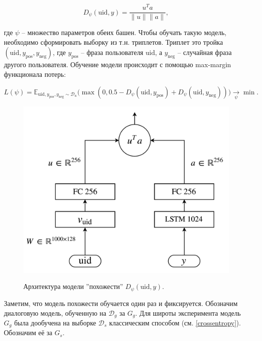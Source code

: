 \documentclass[12pt,a4paper]{amsart}
\begin{document}
\begin{itemize}
	\begin{equation} \label{eq:dssm-scoring-function}
	D_\psi (\text{uid}, y) = \frac{u^T a}{\lVert u \rVert \lVert a \rVert},
	\end{equation}
	
	где $\psi$ -- множество параметров обеих башен. Чтобы обучать такую модель, необходимо сформировать выборку из т.н. триплетов. Триплет это тройка $(\text{uid}, y_{\text{pos}}, y_{\text{neg}})$, где $y_{\text{pos}}$ -- фраза пользователя $\text{uid}$, а $y_{\text{neg}}$ -- случайная фраза другого пользователя. Обучение модели происходит с помощью max-margin функционала потерь:
	
	\begin{equation} \label{eq:dssm-loss}
	L(\psi) = \mathbb{E}_{\text{uid}, y_{\text{pos}}, y_{\text{neg}} \sim \mathcal{D}_u} \big(\max(0, 0.5 - D_\psi (\text{uid}, y_{\text{pos}}) +  D_\psi (\text{uid}, y_{\text{neg}}) )\big) \xrightarrow[\psi]{} \min.
	\end{equation}
\end{itemize}

\begin{figure}[htbp!]
	\caption{Архитектура модели ''похожести'' $D_\psi(\text{uid}, y)$.}
	\includegraphics[scale=0.4]{imgs/dssm-belikex.png}
	\label{fig:belikex-dssm}
	\centering
\end{figure}

Заметим, что модель похожести обучается один раз и фиксируется. Обозначим диалоговую модель, обученную на $\mathcal{D}_g$ за $G_g$. Для широты эксперимента модель $G_g$ была дообучена на выборке $\mathcal{D}_s$ классическим способом (см. \eqref{crossentropy}). Обозначим её за $G_s$.
\end{document}
